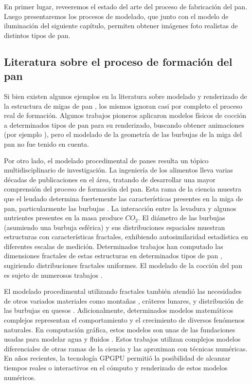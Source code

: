 En primer lugar, reveeremos el estado del arte del proceso de fabricación del pan.
Luego presentaremos los procesos de modelado, que junto con el modelo de iluminación del siguiente capítulo, permiten obtener imágenes foto realistas de distintos tipos de pan.

\subsection{Literatura sobre el proceso de formación del pan}
Si bien existen algunos ejemplos en la literatura sobre modelado y renderizado de la estructura de migas de pan \cite{Tong2005,Xenakis2007}, los mismos ignoran casi por completo el proceso real de formación.
Algunos trabajos pioneros aplicaron modelos físicos de cocción a determinados tipos de pan para su renderizado, buscando obtener animaciones (por ejemplo \cite{Rodriguez-Arenas2011}), pero el modelado de la geometría de las burbujas de la miga del pan no fue tenido en cuenta.

Por otro lado, el modelado procedimental de panes resulta un tópico multidisciplinario de investigación.
La ingeniería de los alimentos lleva varias décadas de publicaciones en el área, tratando de desarrollar una mayor comprensión del proceso de formación del pan.
Esta rama de la ciencia muestra que el leudado determina fuertemente las características presentes en la miga de pan, particularmente las burbujas \cite{Babin2006}.
La interacción entre la levadura y algunos nutrientes presentes en la masa produce {\em $CO_{2}$}. 
El diámetro de las burbujas (asumiendo una burbuja esférica) y sus distribuciones espaciales muestran estructuras con características fractales, exhibiendo autosimilaridad estadística en diferentes escalas de medición.
Determinados trabajos han computado las dimensiones fractales de estas estructuras en determinados tipos de pan \cite{Gonzales2008}, sugiriendo distribuciones fractales uniformes.
El modelado de la cocción del pan es sujeto de numerosos trabajos \cite{Mondal2008}.

El modelado procedimental utilizando fractales también atendió las necesidades de otros variados materiales como montañas \cite{Prusinkiewicz1993}, cráteres lunares, y distribución de las burbujas en quesos \cite{Mandelbrot1983}. 
Adicionalmente, determinados modelos matemáticos complejos representan el comportamiento y el crecimiento de diversos fenómenos naturales.
En computación gráfica, estos modelos son unas de las fundaciones usadas para modelar agua y fluidos \cite{Stam1999,Fedkiw2001}.
Estos trabajos utilizan complejos modelos diferenciales de otras ramas de la ciencia y las aproximan con técnicas numéricas.
En años recientes, la tecnología GPGPU \cite{Owens2007} permitió la posibilidad de alcanzar tiempos reales o interactivos en el cómputo y renderizado de estos modelos numéricos.

